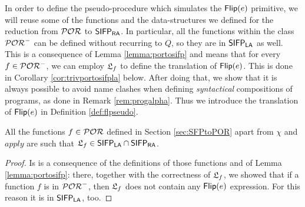 In order to define the pseudo-procedure which simulates the $\mathsf{Flip(}e\mathsf{)} $ primitive,
we will reuse some of the functions and the data-structures we defined for
the reduction from $\mathcal{POR}$ to $\mathsf{SIFP_{{\mathsf{RA}}}}$. In particular, all the functions
within the class $\mathcal{POR}^-$  can be defined without recurring to $Q$,
so they are in $\mathsf{SIFP_{{\mathsf{LA}}}}$ as well.
This is a consequence of
Lemma \ref{lemma:portosifp} and means that for every $f \in \mathcal{POR}^-$,
we can employ ${\mathfrak L_{f}}$
to define the translation of $\mathsf{Flip(}e\mathsf{)}$. This is done in
Corollary \ref{cor:trivportosifpla} below.
%
After doing that, we show that it is always possible to avoid name clashes when
defining \emph{syntactical} compositions of programs, as done in Remark \ref{rem:progalpha}.
%
Thus we introduce the translation of $\mathsf{Flip(}e\mathsf{)}$ in Definition \ref{def:flpseudo}.

\begin{cor}
  \label{cor:trivportosifpla}
  All the functions $f \in \mathcal{POR}$ defined in Section \ref{sec:SFPtoPOR} apart from
  $\chi$ and $\mathit{apply}$ are such that ${\mathfrak L_{f}}\in \mathsf{SIFP_{{\mathsf{LA}}}}\cap \mathsf{SIFP_{{\mathsf{RA}}}}$.
\end{cor}
\begin{proof}
  Is is a consequence of the definitions of those functions and of Lemma
  \ref{lemma:portosifp}: there, together with the correctness of ${\mathfrak L_{f}}$, we showed
  that if a function $f$ is in $\mathcal{POR}^-$, then
  ${\mathfrak L_{f}}$ does not contain any $\mathsf{Flip(}e\mathsf{)}$ expression.
  For this reason it is in $\mathsf{SIFP_{{\mathsf{LA}}}}$, too.
\end{proof}

